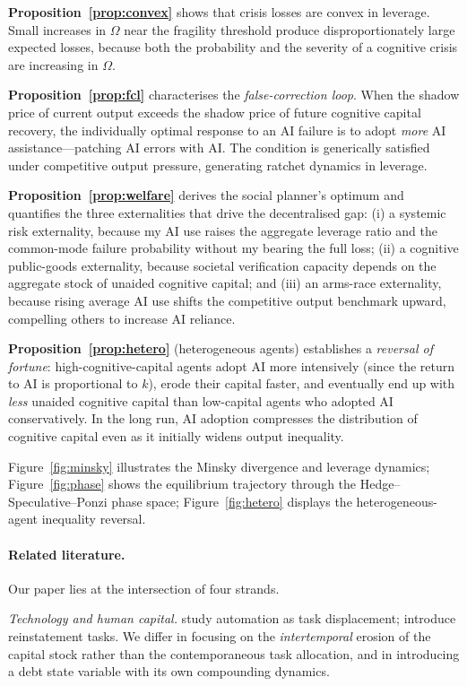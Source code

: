\documentclass[12pt]{article}
\begin{document}
\textbf{Proposition~\ref{prop:convex}} shows that crisis losses are convex in
leverage. Small increases in $\Omega$ near the fragility threshold produce
disproportionately large expected losses, because both the probability and the
severity of a cognitive crisis are increasing in $\Omega$.

\textbf{Proposition~\ref{prop:fcl}} characterises the \emph{false-correction loop}.
When the shadow price of current output exceeds the shadow price of future cognitive
capital recovery, the individually optimal response to an AI failure is to adopt
\emph{more} AI assistance---patching AI errors with AI. The condition is generically
satisfied under competitive output pressure, generating ratchet dynamics in leverage.

\textbf{Proposition~\ref{prop:welfare}} derives the social planner's optimum and
quantifies the three externalities that drive the decentralised gap: (i) a systemic
risk externality, because my AI use raises the aggregate leverage ratio and the
common-mode failure probability without my bearing the full loss; (ii) a cognitive
public-goods externality, because societal verification capacity depends on the
aggregate stock of unaided cognitive capital; and (iii) an arms-race externality,
because rising average AI use shifts the competitive output benchmark upward,
compelling others to increase AI reliance.

\textbf{Proposition~\ref{prop:hetero}} (heterogeneous agents) establishes a
\emph{reversal of fortune}: high-cognitive-capital agents adopt AI more intensively
(since the return to AI is proportional to $k$), erode their capital faster, and
eventually end up with \emph{less} unaided cognitive capital than low-capital agents
who adopted AI conservatively. In the long run, AI adoption compresses the
distribution of cognitive capital even as it initially widens output inequality.

Figure~\ref{fig:minsky} illustrates the Minsky divergence and leverage dynamics;
Figure~\ref{fig:phase} shows the equilibrium trajectory through the Hedge--Speculative--Ponzi
phase space; Figure~\ref{fig:hetero} displays the heterogeneous-agent inequality reversal.

\paragraph{Related literature.} Our paper lies at the intersection of four strands.

\textit{Technology and human capital.} \citet{AcemogluRestrepo2018} study automation
as task displacement; \citet{AcemogluRestrepo2019} introduce reinstatement tasks.
We differ in focusing on the \emph{intertemporal} erosion of the capital stock
rather than the contemporaneous task allocation, and in introducing a debt state
variable with its own compounding dynamics.
\end{document}
